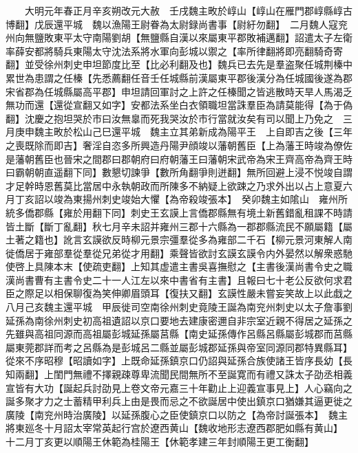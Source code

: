 　　大明元年春正月辛亥朔改元大赦　壬戌魏主畋於崞山【崞山在雁門郡崞縣崞古博翻】戊辰還平城　魏以漁陽王尉眷為太尉録尚書事【尉紆勿翻】　二月魏人寇兖州向無鹽敗東平太守南陽劉胡【無鹽縣自漢以來屬東平郡敗補邁翻】詔遣太子左衛率薛安都將騎兵東陽太守沈法系將水軍向彭城以禦之【率所律翻將即亮翻騎奇寄翻】並受徐州刺史申坦節度比至【比必利翻及也】魏兵已去先是羣盗聚任城荆榛中累世為患謂之任榛【先悉薦翻任音壬任城縣前漢屬東平郡後漢分為任城國後遂為郡宋省郡為任城縣屬高平郡】申坦請回軍討之上許之任榛聞之皆逃散時天旱人馬渴乏無功而還【還從宣翻又如字】安都法系坐白衣領職坦當誅羣臣為請莫能得【為于偽翻】沈慶之抱坦哭於市曰汝無辠而死我哭汝於市行當就汝矣有司以聞上乃免之　三月庚申魏主畋於松山己巳還平城　魏主立其弟新成為陽平王　上自即吉之後【三年之喪既除而即吉】奢淫自恣多所興造丹陽尹顔竣以藩朝舊臣【上為藩王時竣為僚佐是藩朝舊臣也晉宋之間郡曰郡朝府曰府朝藩王曰藩朝宋武帝為宋王齊高帝為齊王時曰霸朝朝直遥翻下同】數懇切諫爭【數所角翻爭則迸翻】無所回避上浸不悦竣自謂才足幹時恩舊莫比當居中永執朝政而所陳多不納疑上欲踈之乃求外出以占上意夏六月丁亥詔以竣為東揚州刺史竣始大懼【為帝殺竣張本】　癸卯魏主如隂山　雍州所統多僑郡縣【雍於用翻下同】刺史王玄謨上言僑郡縣無有境土新舊錯亂租課不時請皆土斷【斷丁亂翻】秋七月辛未詔并雍州三郡十六縣為一郡郡縣流民不願屬籍【屬土著之籍也】訛言玄謨欲反時柳元景宗彊羣從多為雍部二千石【柳元景河東解人南徙僑居于雍部羣從羣從兄弟從才用翻】乘聲皆欲討玄謨玄謨令内外晏然以解衆惑馳使啓上具陳本末【使疏吏翻】上知其虚遣主書吳喜撫慰之【主書後漢尚書令史之職漢尚書曹有主書令史二十一人江左以來中書省有主書】且報曰七十老公反欲何求君臣之際足以相保聊復為笑伸卿眉頭耳【復扶又翻】玄謨性嚴未嘗妄笑故上以此戱之　八月己亥魏主還平城　甲辰徙司空南徐州刺史竟陵王誕為南兖州刺史以太子詹事劉延孫為南徐州刺史初高祖遺詔以京口要地去建康密邇自非宗室近親不得居之延孫之先雖與高祖同源而高祖屬彭城延孫屬莒縣【南史延孫傳作呂縣呂縣屬彭城郡而莒縣屬東莞郡詳而考之呂縣為是彭城呂二縣並屬彭城郡延孫與帝室同源同郡特異縣耳】從來不序昭穆【昭讀如字】上既命延孫鎮京口仍詔與延孫合族使諸王皆序長幼【長知兩翻】上閨門無禮不擇親疎尊卑流聞民間無所不至誕寛而有禮又誅太子劭丞相義宣皆有大功【誕起兵討劭見上卷文帝元嘉三十年勸止上迎義宣事見上】人心竊向之誕多聚才力之士蓄精甲利兵上由是畏而忌之不欲誕居中使出鎮京口猶嫌其逼更徙之廣陵【南兖州時治廣陵】以延孫腹心之臣使鎮京口以防之【為帝討誕張本】　魏主將東廵冬十月詔太宰常英起行宫於遼西黄山【魏收地形志遼西郡肥如縣有黄山】　十二月丁亥更以順陽王休範為桂陽王【休範孝建三年封順陽王更工衡翻】

